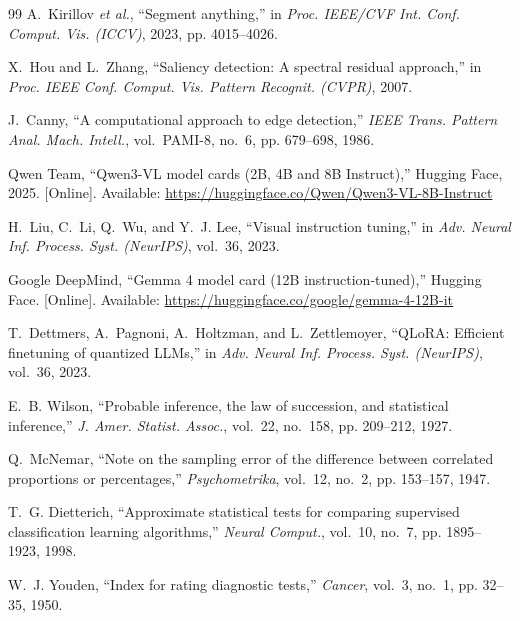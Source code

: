 \documentclass[conference]{IEEEtran}
\begin{document}
\begin{thebibliography}{99}
A.~Kirillov \emph{et al.}, ``Segment anything,'' in \emph{Proc. IEEE/CVF Int. Conf. Comput. Vis.
(ICCV)}, 2023, pp. 4015--4026.

X.~Hou and L.~Zhang, ``Saliency detection: A spectral residual approach,'' in \emph{Proc. IEEE Conf.
Comput. Vis. Pattern Recognit. (CVPR)}, 2007.

J.~Canny, ``A computational approach to edge detection,'' \emph{IEEE Trans. Pattern Anal. Mach.
Intell.}, vol.~PAMI-8, no.~6, pp. 679--698, 1986.

Qwen Team, ``{Qwen3-VL} model cards (2B, 4B and 8B Instruct),'' Hugging Face, 2025. [Online]. Available:
\url{https://huggingface.co/Qwen/Qwen3-VL-8B-Instruct}

H.~Liu, C.~Li, Q.~Wu, and Y.~J. Lee, ``Visual instruction tuning,'' in \emph{Adv. Neural Inf.
Process. Syst. (NeurIPS)}, vol.~36, 2023.

Google DeepMind, ``Gemma 4 model card (12B instruction-tuned),'' Hugging Face. [Online]. Available:
\url{https://huggingface.co/google/gemma-4-12B-it}

T.~Dettmers, A.~Pagnoni, A.~Holtzman, and L.~Zettlemoyer, ``{QLoRA}: Efficient finetuning of
quantized {LLMs},'' in \emph{Adv. Neural Inf. Process. Syst. (NeurIPS)}, vol.~36, 2023.

E.~B. Wilson, ``Probable inference, the law of succession, and statistical inference,'' \emph{J. Amer.
Statist. Assoc.}, vol.~22, no.~158, pp. 209--212, 1927.

Q.~McNemar, ``Note on the sampling error of the difference between correlated proportions or
percentages,'' \emph{Psychometrika}, vol.~12, no.~2, pp. 153--157, 1947.

T.~G. Dietterich, ``Approximate statistical tests for comparing supervised classification learning
algorithms,'' \emph{Neural Comput.}, vol.~10, no.~7, pp. 1895--1923, 1998.

W.~J. Youden, ``Index for rating diagnostic tests,'' \emph{Cancer}, vol.~3, no.~1, pp. 32--35, 1950.

\end{thebibliography}
\end{document}
